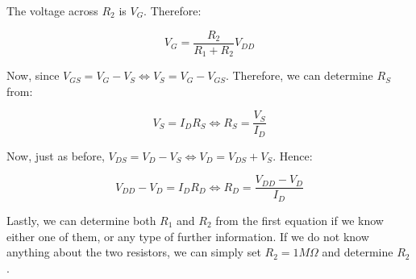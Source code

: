 \documentclass{article}
\begin{document}
The voltage across $R_2$ is $V_G$. Therefore:

\[ V_G = \frac{R_2}{R_1 + R_2}V_{DD} \]

Now, since $V_{GS} = V_G - V_S \iff V_S = V_G - V_{GS}$. Therefore, we can determine $R_S$ from:

\[ V_S = I_DR_S \iff R_S = \frac{V_S}{I_D} \]

Now, just as before, $V_{DS} = V_D - V_S \iff V_D = V_{DS} + V_S$. Hence:

\[ V_{DD} - V_D = I_DR_D \iff R_D = \frac{V_{DD} - V_D}{I_D} \]

Lastly, we can determine both $R_1$ and $R_2$ from the first equation if we know either one of them, or any type of further information. If we do not know anything about the two resistors, we can simply set $R_2 = 1M\Omega$ and determine $R_2$.
\end{document}
